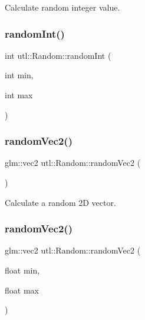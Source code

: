 Calculate random integer value. \mbox{\label{classutl_1_1_random_a61dc7caa999d944c517a9dac8facaab3}} 
\subsubsection{\texorpdfstring{random\+Int()}{randomInt()}\hspace{0.1cm}{\footnotesize\ttfamily [2/2]}}
{\footnotesize\ttfamily int utl\+::\+Random\+::random\+Int (\begin{DoxyParamCaption}\item[{int}]{min,  }\item[{int}]{max }\end{DoxyParamCaption})\hspace{0.3cm}{\ttfamily [static]}}

\mbox{\label{classutl_1_1_random_ac9078b280a84048158127532cbcb0e43}} 
\subsubsection{\texorpdfstring{random\+Vec2()}{randomVec2()}\hspace{0.1cm}{\footnotesize\ttfamily [1/2]}}
{\footnotesize\ttfamily glm\+::vec2 utl\+::\+Random\+::random\+Vec2 (\begin{DoxyParamCaption}{ }\end{DoxyParamCaption})\hspace{0.3cm}{\ttfamily [static]}}

Calculate a random 2D vector. \mbox{\label{classutl_1_1_random_a00632573896ef61e7ba0fdcedcdf3266}} 
\subsubsection{\texorpdfstring{random\+Vec2()}{randomVec2()}\hspace{0.1cm}{\footnotesize\ttfamily [2/2]}}
{\footnotesize\ttfamily glm\+::vec2 utl\+::\+Random\+::random\+Vec2 (\begin{DoxyParamCaption}\item[{float}]{min,  }\item[{float}]{max }\end{DoxyParamCaption})\hspace{0.3cm}{\ttfamily [static]}}

